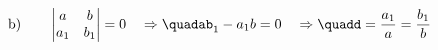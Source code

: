 \documentclass[preview]{standalone}
\begin{document}
\begin{align*}
\text{b)}\qquad\begin{vmatrix}a&b\\a_1&b_1\\\end{vmatrix}=0\quad\Rightarrow\quadab_1-a_1b=0\quad\Rightarrow\quadd=\frac{a_1}{a}=\frac{b_1}{b}
\end{align*}
\end{document}
